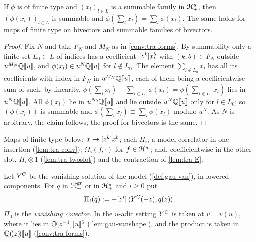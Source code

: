 \begin{lem}
\label{lem:tra-sum}
If $\phi$ is of finite type and $(x_l)_{l\in L}$ is a summable family in $\mathcal{H}^u_+$, then $(\phi(x_l))_{l\in L}$ is summable and $\phi(\sum_lx_l) = \sum_l\phi(x_l)$. The same holds for maps of finite type on bivectors and summable families of bivectors.
\end{lem}

\begin{proof}
Fix $N$ and take $F_N$ and $M_N$ as in \cref{conv:tra-forms}. By summability only a finite set $L_0\subset L$ of indices has a coefficient $[z^k]x_l^b$ with $(k,b)\in F_N$ outside $u^{M_N}\mathbb{Q}[\![ u ]\!]$, and $\phi(x_l)\in u^N\mathbb{Q}[\![ u ]\!]$ for $l\notin L_0$. The element $\sum_{l\notin L_0}x_l$ has all its coefficients with index in $F_N$ in $u^{M_N}\mathbb{Q}[\![ u ]\!]$, each of them being a coefficientwise sum of such; by linearity, $\phi(\sum_lx_l)-\sum_{l\in L_0}\phi(x_l) = \phi(\sum_{l\notin L_0}x_l)$ lies in $u^N\mathbb{Q}[\![ u ]\!]$. All $\phi(x_l)$ lie in $u^{N_0}\mathbb{Q}[\![ u ]\!]$ and lie outside $u^N\mathbb{Q}[\![ u ]\!]$ only for $l\in L_0$; so $(\phi(x_l))$ is summable and $\phi(\sum_lx_l)\equiv\sum_l\phi(x_l)$ modulo $u^N$. As $N$ is arbitrary, the claim follows; the proof for bivectors is the same.
\end{proof}

Maps of finite type below: $x\mapsto[z^k]x^b$; each $\Pi_i$; a model correlator in one insertion (\cref{lem:tra-conv}); $\Omega_{\mathrm s}(f,\cdot)$ for $f\in\mathcal{H}^u_-$; and, coefficientwise in the other slot, $\Pi_i\otimes 1$ (\cref{lem:tra-twoslot}) and the contraction of \cref{lem:tra-E}.

\begin{defn}
\label{def:tra-tower}
Let $Y^{\mathrm{C}}$ be the vanishing solution of the model (\cref{def:gau-van}), in lowered components. For $q$ in $\mathcal{H}^{\mathrm{gr}}_+$ or in $\mathcal{H}^u_+$ and $i\geq 0$ put
\begin{equation}
\label{eq:tra-tower}
\Pi_i(q) := -[z^i]\,\langle Y^{\mathrm{C}}(-z),q(z)\rangle .
\end{equation}
$\Pi_0$ is the \emph{vanishing covector}. In the $u$-adic setting $Y^{\mathrm{C}}$ is taken at $v = v(u)$, where it lies in $\mathbb{Q}[z^{-1}][\![ u ]\!]^5$ (\cref{lem:gau-vanshape}), and the product is taken in $\mathbb{Q}(\!(z)\!)[\![ u ]\!]$ (\cref{conv:tra-forms}).
\end{defn}

